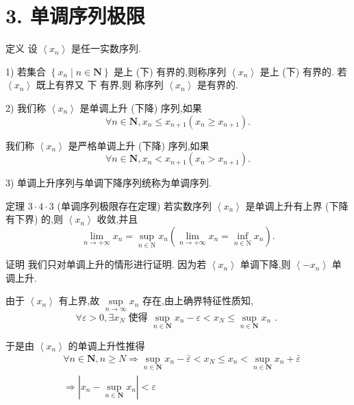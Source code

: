 \section*{3. 单调序列极限}

定义 设 $\left\langle  {x}_{n}\right\rangle$ 是任一实数序列.

1) 若集合 $\left\{  {{x}_{n} \mid  n \in  \mathbf{N}}\right\}$ 是上 (下) 有界的,则称序列 $\left\langle  {x}_{n}\right\rangle$ 是上 (下) 有界的. 若 $\left\langle  {x}_{n}\right\rangle$ 既上有界又 下 有界,则 称序列 $\left\langle  {x}_{n}\right\rangle$ 是有界的.

2) 我们称 $\left\langle  {x}_{n}\right\rangle$ 是单调上升 (下降) 序列,如果
$$\forall n \in  \mathbf{N},{x}_{n} \leq  {x}_{n + 1}\left( {{x}_{n} \geq  {x}_{n + 1}}\right) .$$

我们称 $\left\langle  {x}_{n}\right\rangle$ 是严格单调上升 (下降) 序列,如果
$$\forall n \in  \mathbf{N},{x}_{n} < {x}_{n + 1}\left( {{x}_{n} > {x}_{n + 1}}\right) .$$

3) 单调上升序列与单调下降序列统称为单调序列.

定理 $3 \cdot  4 \cdot  3$ (单调序列极限存在定理) 若实数序列 $\left\langle  {x}_{n}\right\rangle$ 是单调上升有上界 (下降有下界) 的,则 $\left\langle  {x}_{n}\right\rangle$ 收敛,并且
$$\mathop{\lim }\limits_{{n \rightarrow   + \infty }}{x}_{n} = \mathop{\sup }\limits_{{n \in  \mathrm{N}}}{x}_{n}\left( {\mathop{\lim }\limits_{{n \rightarrow   + \infty }}{x}_{n} = \mathop{\inf }\limits_{{n \in  \mathrm{N}}}{x}_{n}}\right) .$$

证明 我们只对单调上升的情形进行证明. 因为若 $\left\langle  {x}_{n}\right\rangle$ 单调下降,则 $\left\langle  {-{x}_{n}}\right\rangle$ 单调上升.

由于 $\left\langle  {x}_{n}\right\rangle$ 有上界,故 $\mathop{\sup }\limits_{{n \rightarrow  \infty }}{x}_{n}$ 存在,由上确界特征性质知,
$$\forall \varepsilon  > 0,\exists {x}_{N}\text{ 使得 }\mathop{\sup }\limits_{{n \in  \mathbf{N}}}{x}_{n} - \varepsilon  < {x}_{N} \leq  \mathop{\sup }\limits_{{n \in  \mathbf{N}}}{x}_{n}\text{ . }$$

于是由 $\left\langle  {x}_{n}\right\rangle$ 的单调上升性推得
\begin{align*}
	&\forall n \in  \mathbf{N},n \geq  N \Rightarrow  \mathop{\sup }\limits_{{n \in  \mathbf{N}}}{x}_{n} - \bar{\varepsilon } < {x}_{N} \leq  {x}_{n} < \mathop{\sup }\limits_{{n \in  \mathbf{N}}}{x}_{n} + \bar{\varepsilon }\\
	&\Rightarrow  \left| {{x}_{n} - \mathop{\sup }\limits_{{n \in  \mathbf{N}}}{x}_{n}}\right|  < \varepsilon
\end{align*}

